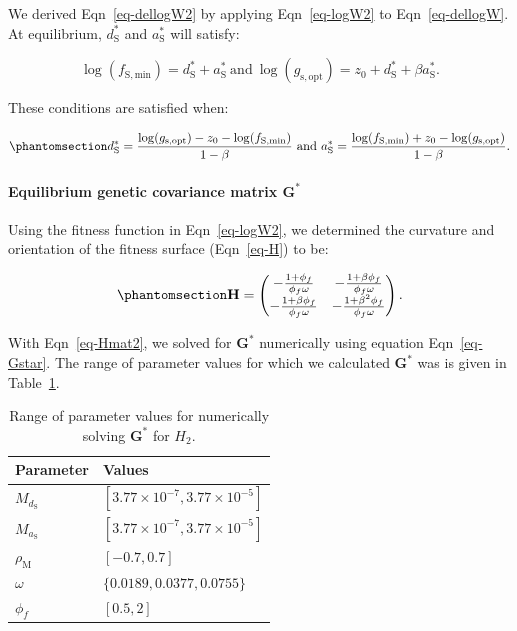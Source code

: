 \documentclass[
  letterpaper,
  DIV=11,
  numbers=noendperiod]{scrartcl}
\let\oldparagraph\paragraph
\renewcommand{\paragraph}[1]{\oldparagraph{#1}\mbox{}}
\begin{document}
We derived Eqn~\ref{eq-dellogW2} by applying Eqn~\ref{eq-logW2} to
Eqn~\ref{eq-dellogW}. At equilibrium, \(d_\mathrm{S}^*\) and
\(a_\mathrm{S}^*\) will satisfy:

\[\log (f_\mathrm{S,min}) = d_\mathrm{S}^* + a_\mathrm{S}^*~\text{and}~\log (g_\mathrm{s,opt}) = z_0 + d_\mathrm{S}^* + \beta a_\mathrm{S}^*.\]

These conditions are satisfied when:

\begin{equation}\phantomsection\label{eq-xstar2}{d_\mathrm{S}^* = \frac{\log (g_\mathrm{s,opt}) - z_0 - \log (f_\mathrm{S,min})}{1 - \beta} ~\text{and}~a_\mathrm{S}^* = \frac{\log (f_\mathrm{S,min}) + z_0 - \log (g_\mathrm{s,opt})}{1 - \beta}.}\end{equation}

\paragraph{\texorpdfstring{Equilibrium genetic covariance matrix
\(\mathbf{G}^*\)}{Equilibrium genetic covariance matrix \textbackslash mathbf\{G\}\^{}*}}\label{equilibrium-genetic-covariance-matrix-mathbfg-1}

Using the fitness function in Eqn~\ref{eq-logW2}, we determined the
curvature and orientation of the fitness surface (Eqn~\ref{eq-H}) to be:

\begin{equation}\phantomsection\label{eq-Hmat2}{\mathbf{H} = \begin{pmatrix} -\frac{1 + \phi_f}{\phi_f \omega} & -\frac{1 + \beta \phi_f}{\phi_f \omega} \\ -\frac{1 + \beta \phi_f}{\phi_f \omega} & -\frac{1 + \beta ^2 \phi_f}{\phi_f \omega} \end{pmatrix}.}\end{equation}

With Eqn~\ref{eq-Hmat2}, we solved for \(\mathbf{G}^*\) numerically
using equation Eqn~\ref{eq-Gstar}. The range of parameter values for
which we calculated \(\mathbf{G}^*\) was is given in
Table~\ref{tbl-G_h2_pars}.

\begin{longtable}[]{@{}ll@{}}

\caption{\label{tbl-G_h2_pars}Range of parameter values for numerically
solving \(\mathbf{G}^*\) for \(H_2\).}

\tabularnewline

\toprule\noalign{}
Parameter & Values \\
\midrule\noalign{}
\endhead
\bottomrule\noalign{}
\endlastfoot
\(M_{d_\mathrm{S}}\) &
\([3.77 \times 10 ^ {-7}, 3.77 \times 10 ^ {-5}]\) \\
\(M_{a_\mathrm{S}}\) &
\([3.77 \times 10 ^ {-7}, 3.77 \times 10 ^ {-5}]\) \\
\(\rho_\mathrm{M}\) & \([-0.7, 0.7]\) \\
\(\omega\) & \(\{0.0189, 0.0377, 0.0755\}\) \\
\(\phi_f\) & \([0.5, 2]\) \\

\end{longtable}
\end{document}
